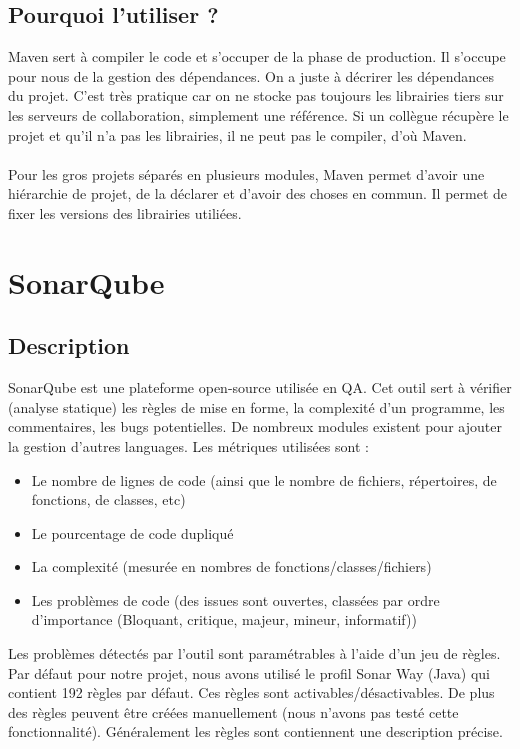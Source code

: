 \documentclass{article}
\begin{document}
\subsection{Pourquoi l'utiliser ?}
Maven sert à compiler le code et s'occuper de la phase de production. Il s'occupe pour nous de la gestion des dépendances. On a juste à décrirer les dépendances du projet. C'est très pratique car on ne stocke pas toujours les librairies tiers sur les serveurs de collaboration, simplement une référence. Si un collègue récupère le projet et qu'il n'a pas les librairies, il ne peut pas le compiler, d'où Maven. \\\\
Pour les gros projets séparés en plusieurs modules, Maven permet d'avoir une hiérarchie de projet, de la déclarer et d'avoir des choses en commun. Il permet de fixer les versions des librairies utiliées.

\section{SonarQube}
\subsection{Description}
SonarQube est une plateforme open-source utilisée en QA. Cet outil sert à vérifier (analyse statique) les règles de mise en forme, la complexité d'un programme, les commentaires, les bugs potentielles. De nombreux modules existent pour ajouter la gestion d'autres languages. Les métriques utilisées sont :
\begin{itemize}
	\item Le nombre de lignes de code (ainsi que le nombre de fichiers, répertoires, de fonctions, de classes, etc)
	\item Le pourcentage de code dupliqué
	\item La complexité (mesurée en nombres de fonctions/classes/fichiers)
	\item Les problèmes de code (des issues sont ouvertes, classées par ordre d'importance (Bloquant, critique, majeur, mineur, informatif))
\end{itemize}
Les problèmes détectés par l'outil sont paramétrables à l'aide d'un jeu de règles. Par défaut pour notre projet, nous avons utilisé le profil Sonar Way (Java) qui contient 192 règles par défaut. Ces règles sont activables/désactivables. De plus des règles peuvent être créées manuellement (nous n'avons pas testé cette fonctionnalité). Généralement les règles sont contiennent une description précise.
\end{document}
